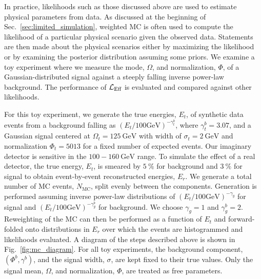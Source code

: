 In practice, likelihoods such as those discussed above are used to estimate physical parameters from data.
As discussed at the beginning of Sec.~\ref{sec:limited_simulation}, weighted MC is often used to compute the likelihood of a particular physical scenario given the observed data.
Statements are then made about the physical scenarios either by maximizing the likelihood or by examining the posterior distribution assuming some priors.
We examine a toy experiment where we measure the mode, $\Omega$, and normalization, $\Phi$, of a Gaussian-distributed signal against a steeply falling inverse power-law background.
The performance of $\mathcal{L}_\textmd{Eff}$ is evaluated and compared against other likelihoods.

For this toy experiment, we generate the true energies, $E_t$, of synthetic data events from a background falling as $(E_t/100 \mathrm{GeV})^{-\gamma_t^b}$, where $\gamma_t^b=3.07$, and a Gaussian signal centered at $\Omega_t=\SI{125}\GeV$ with width of $\sigma_t=\SI{2}\GeV$ and normalization $\Phi_t=5013$ for a fixed number of expected events.
Our imaginary detector is sensitive in the $100-\SI{160}\GeV$ range.
To simulate the effect of a real detector, the true energy, $E_t$, is smeared by $\SI{5}\percent$ for background and $\SI{3}\percent$ for signal to obtain event-by-event reconstructed energies, $E_r$.
We generate a total number of MC events, $N_{\mathrm{MC}}$, split evenly between the components.
Generation is performed assuming inverse power-law distributions of $(E_t/100 \mathrm{GeV})^{-\gamma_g}$ for signal and $(E_t/100 \mathrm{GeV})^{-\gamma_g^b}$ for background.
We choose $\gamma_g=1$ and $\gamma_g^b=2$.
Reweighting of the MC can then be performed as a function of $E_t$ and forward-folded onto distributions in $E_r$ over which the events are histogrammed and likelihoods evaluated.
A diagram of the steps described above is shown in Fig.~\ref{fig:mc_diagram}.
For all toy experiments, the background component, $(\Phi^b,\gamma^b)$, and the signal width, $\sigma$, are kept fixed to their true values.
Only the signal mean, $\Omega$, and normalization, $\Phi$, are treated as free parameters.

